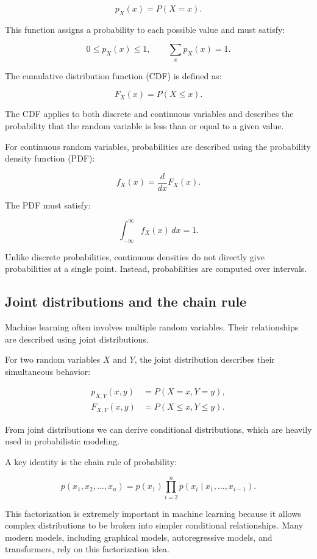 \documentclass{article}
\begin{document}
\[
p_X(x) = P(X=x).
\]

This function assigns a probability to each possible value and must satisfy:

\[
0 \le p_X(x) \le 1, \qquad \sum_x p_X(x)=1.
\]

The cumulative distribution function (CDF) is defined as:

\[
F_X(x) = P(X \le x).
\]

The CDF applies to both discrete and continuous variables and describes the probability that the random variable is less than or equal to a given value.

For continuous random variables, probabilities are described using the probability density function (PDF):

\[
f_X(x) = \frac{d}{dx}F_X(x).
\]

The PDF must satisfy:

\[
\int_{-\infty}^{\infty} f_X(x)\,dx = 1.
\]

Unlike discrete probabilities, continuous densities do not directly give probabilities at a single point. Instead, probabilities are computed over intervals.

\subsection{Joint distributions and the chain rule}

Machine learning often involves multiple random variables. Their relationships are described using joint distributions.

For two random variables $X$ and $Y$, the joint distribution describes their simultaneous behavior:

\begin{align*}
p_{X,Y}(x,y) &= P(X=x, Y=y), \\
F_{X,Y}(x,y) &= P(X\le x, Y\le y).
\end{align*}

From joint distributions we can derive conditional distributions, which are heavily used in probabilistic modeling.

A key identity is the chain rule of probability:

\[
p(x_1,x_2,\dots,x_n) = p(x_1)\prod_{i=2}^n p(x_i\mid x_1,\dots,x_{i-1}).
\]

This factorization is extremely important in machine learning because it allows complex distributions to be broken into simpler conditional relationships. Many modern models, including graphical models, autoregressive models, and transformers, rely on this factorization idea.
\end{document}
